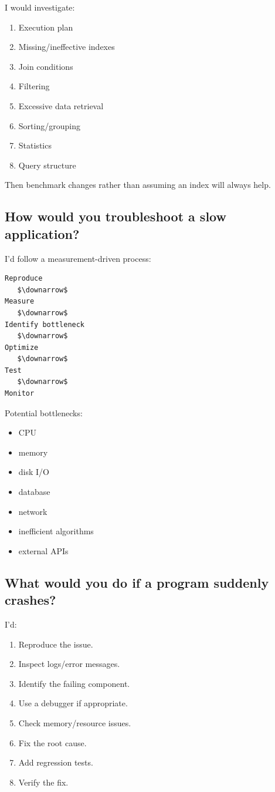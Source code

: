 I would investigate:

\begin{enumerate}
  \item Execution plan
  \item Missing/ineffective indexes
  \item Join conditions
  \item Filtering
  \item Excessive data retrieval
  \item Sorting/grouping
  \item Statistics
  \item Query structure
\end{enumerate}

Then benchmark changes rather than assuming an index will always help.

\medskip

\subsection{How would you troubleshoot a slow application?}

I'd follow a measurement-driven process:

\begin{lstlisting}
Reproduce
   $\downarrow$
Measure
   $\downarrow$
Identify bottleneck
   $\downarrow$
Optimize
   $\downarrow$
Test
   $\downarrow$
Monitor
\end{lstlisting}

Potential bottlenecks:

\begin{itemize}
  \item CPU
  \item memory
  \item disk I/O
  \item database
  \item network
  \item inefficient algorithms
  \item external APIs
\end{itemize}

\medskip

\subsection{What would you do if a program suddenly crashes?}

I'd:

\begin{enumerate}
  \item Reproduce the issue.
  \item Inspect logs/error messages.
  \item Identify the failing component.
  \item Use a debugger if appropriate.
  \item Check memory/resource issues.
  \item Fix the root cause.
  \item Add regression tests.
  \item Verify the fix.
\end{enumerate}

